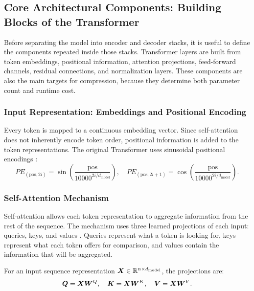 \subsection{Core Architectural Components: Building Blocks of the Transformer}

Before separating the model into encoder and decoder stacks, it is useful to define the components repeated inside those stacks. Transformer layers are built from token embeddings, positional information, attention projections, feed-forward channels, residual connections, and normalization layers. These components are also the main targets for compression, because they determine both parameter count and runtime cost.

\subsubsection{Input Representation: Embeddings and Positional Encoding}

Every token is mapped to a continuous embedding vector. Since self-attention does not inherently encode token order, positional information is added to the token representations. The original Transformer uses sinusoidal positional encodings \cite{vaswani2017attention}:
\begin{equation}
    PE_{(\text{pos}, 2i)} = \sin\left(\frac{\text{pos}}{10000^{2i/d_{\text{model}}}}\right), \quad
    PE_{(\text{pos}, 2i+1)} = \cos\left(\frac{\text{pos}}{10000^{2i/d_{\text{model}}}}\right).
\end{equation}

\subsubsection{Self-Attention Mechanism}

Self-attention allows each token representation to aggregate information from the rest of the sequence. The mechanism uses three learned projections of each input: queries, keys, and values \cite{vaswani2017attention}. Queries represent what a token is looking for, keys represent what each token offers for comparison, and values contain the information that will be aggregated.

For an input sequence representation $\bm{X} \in \mathbb{R}^{n \times d_{\text{model}}}$, the projections are:
\begin{equation}
    \bm{Q} = \bm{X}\bm{W}^{Q}, \quad
    \bm{K} = \bm{X}\bm{W}^{K}, \quad
    \bm{V} = \bm{X}\bm{W}^{V}.
\end{equation}

